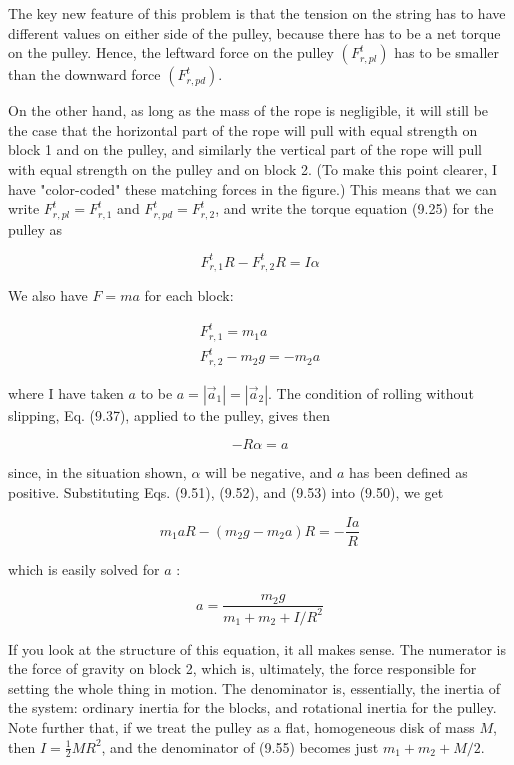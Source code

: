 \documentclass[10pt]{article}
\begin{document}
The key new feature of this problem is that the tension on the string has to have different values on either side of the pulley, because there has to be a net torque on the pulley. Hence, the leftward force on the pulley $\left(F_{r, p l}^{t}\right)$ has to be smaller than the downward force $\left(F_{r, p d}^{t}\right)$.

On the other hand, as long as the mass of the rope is negligible, it will still be the case that the horizontal part of the rope will pull with equal strength on block 1 and on the pulley, and similarly the vertical part of the rope will pull with equal strength on the pulley and on block 2. (To make this point clearer, I have "color-coded" these matching forces in the figure.) This means that we can write $F_{r, p l}^{t}=F_{r, 1}^{t}$ and $F_{r, p d}^{t}=F_{r, 2}^{t}$, and write the torque equation (9.25) for the pulley as


\begin{equation*}
F_{r, 1}^{t} R-F_{r, 2}^{t} R=I \alpha \tag{9.50}
\end{equation*}


We also have $F=m a$ for each block:


\begin{gather*}
F_{r, 1}^{t}=m_{1} a  \tag{9.51}\\
F_{r, 2}^{t}-m_{2} g=-m_{2} a \tag{9.52}
\end{gather*}


where I have taken $a$ to be $a=\left|\vec{a}_{1}\right|=\left|\vec{a}_{2}\right|$. The condition of rolling without slipping, Eq. (9.37), applied to the pulley, gives then


\begin{equation*}
-R \alpha=a \tag{9.53}
\end{equation*}


since, in the situation shown, $\alpha$ will be negative, and $a$ has been defined as positive. Substituting Eqs. (9.51), (9.52), and (9.53) into (9.50), we get


\begin{equation*}
m_{1} a R-\left(m_{2} g-m_{2} a\right) R=-\frac{I a}{R} \tag{9.54}
\end{equation*}


which is easily solved for $a$ :


\begin{equation*}
a=\frac{m_{2} g}{m_{1}+m_{2}+I / R^{2}} \tag{9.55}
\end{equation*}


If you look at the structure of this equation, it all makes sense. The numerator is the force of gravity on block 2, which is, ultimately, the force responsible for setting the whole thing in motion. The denominator is, essentially, the inertia of the system: ordinary inertia for the blocks, and rotational inertia for the pulley. Note further that, if we treat the pulley as a flat, homogeneous disk of mass $M$, then $I=\frac{1}{2} M R^{2}$, and the denominator of (9.55) becomes just $m_{1}+m_{2}+M / 2$.
\end{document}
